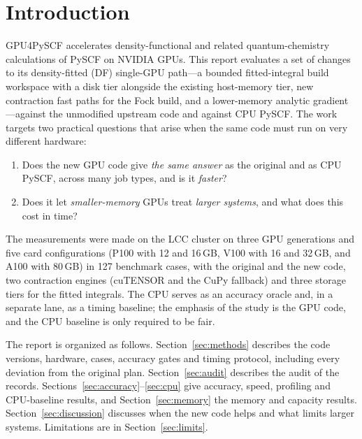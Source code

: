 \section{Introduction}

GPU4PySCF accelerates density-functional and related quantum-chemistry calculations of PySCF on NVIDIA GPUs. This report evaluates a set of changes to its density-fitted (DF) single-GPU path---a bounded fitted-integral build workspace with a disk tier alongside the existing host-memory tier, new contraction fast paths for the Fock build, and a lower-memory analytic gradient---against the unmodified upstream code and against CPU PySCF. The work targets two practical questions that arise when the same code must run on very different hardware:

\begin{enumerate}[itemsep=1pt]
\item Does the new GPU code give \emph{the same answer} as the original and as CPU PySCF, across many job types, and is it \emph{faster}?
\item Does it let \emph{smaller-memory} GPUs treat \emph{larger systems}, and what does this cost in time?
\end{enumerate}

The measurements were made on the LCC cluster on three GPU generations and five card configurations (P100 with 12 and 16\,GB, V100 with 16 and 32\,GB, and A100 with 80\,GB) in 127 benchmark cases, with the original and the new code, two contraction engines (cuTENSOR and the CuPy fallback) and three storage tiers for the fitted integrals. The CPU serves as an accuracy oracle and, in a separate lane, as a timing baseline; the emphasis of the study is the GPU code, and the CPU baseline is only required to be fair.

The report is organized as follows. Section~\ref{sec:methods} describes the code versions, hardware, cases, accuracy gates and timing protocol, including every deviation from the original plan. Section~\ref{sec:audit} describes the audit of the records. Sections~\ref{sec:accuracy}--\ref{sec:cpu} give accuracy, speed, profiling and CPU-baseline results, and Section~\ref{sec:memory} the memory and capacity results. Section~\ref{sec:discussion} discusses when the new code helps and what limits larger systems. Limitations are in Section~\ref{sec:limits}.
